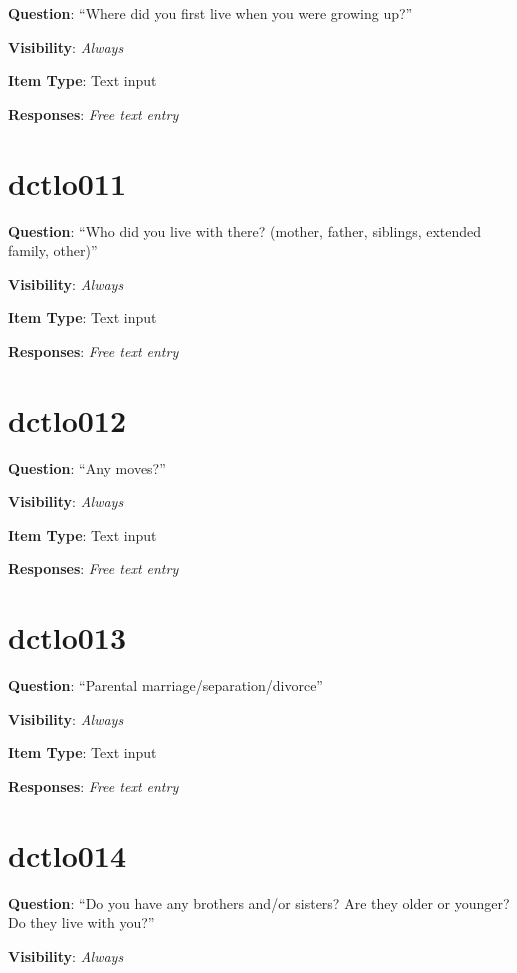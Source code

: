 \documentclass[]{book}
\begin{document}
\textbf{Question}: ``Where did you first live when you were growing up?''

\textbf{Visibility}: \emph{Always}

\textbf{Item Type}: Text input

\textbf{Responses}: \emph{Free text entry}

\hypertarget{dctlo011}{%
\section{dctlo011}\label{dctlo011}}

\textbf{Question}: ``Who did you live with there? (mother, father, siblings, extended family, other)''

\textbf{Visibility}: \emph{Always}

\textbf{Item Type}: Text input

\textbf{Responses}: \emph{Free text entry}

\hypertarget{dctlo012}{%
\section{dctlo012}\label{dctlo012}}

\textbf{Question}: ``Any moves?''

\textbf{Visibility}: \emph{Always}

\textbf{Item Type}: Text input

\textbf{Responses}: \emph{Free text entry}

\hypertarget{dctlo013}{%
\section{dctlo013}\label{dctlo013}}

\textbf{Question}: ``Parental marriage/separation/divorce''

\textbf{Visibility}: \emph{Always}

\textbf{Item Type}: Text input

\textbf{Responses}: \emph{Free text entry}

\hypertarget{dctlo014}{%
\section{dctlo014}\label{dctlo014}}

\textbf{Question}: ``Do you have any brothers and/or sisters? Are they older or younger? Do they live with you?''

\textbf{Visibility}: \emph{Always}
\end{document}
